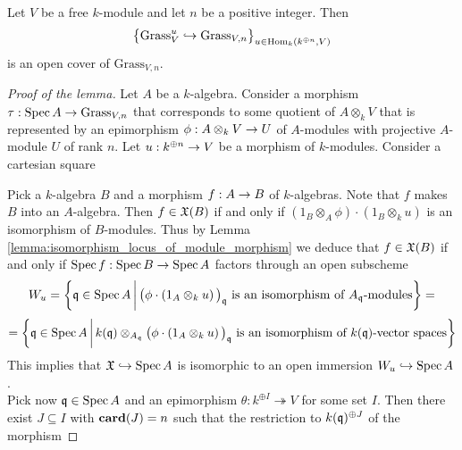 \begin{lemma}\label{lemma:standard_open_cover_of_grassmannian}
Let $V$ be a free $k$-module and let $n$ be a positive integer. Then
$$\big\{\mathrm{Grass}_{V}^u\hookrightarrow \mathrm{Grass}_{V,n} \big\}_{u\in \mathrm{Hom}_k\left(k^{\oplus n},V\right)}$$
is an open cover of $\mathrm{Grass}_{V,n}$.
\end{lemma}
\begin{proof}[Proof of the lemma]
Let $A$ be a $k$-algebra. Consider a morphism $\tau:\mathrm{Spec}\, A\rightarrow \mathrm{Grass}_{V,n}$ that corresponds to some quotient of $A\otimes_kV$ that is represented by an epimorphism $\phi:A\otimes_kV\rightarrow U$ of $A$-modules with projective $A$-module $U$ of rank $n$. Let $u:k^{\oplus n}\rightarrow V$ be a morphism of $k$-modules. Consider a cartesian square
\begin{center}
\end{center}
Pick a $k$-algebra $B$ and a morphism $f:A\rightarrow B$ of $k$-algebras. Note that $f$ makes $B$ into an $A$-algebra. Then $f\in {\mathfrak X}(B)$ if and only if $\left(1_B\otimes_A\phi\right)\cdot \left(1_B\otimes_ku\right)$ is an isomorphism of $B$-modules. Thus by Lemma \ref{lemma:isomorphism_locus_of_module_morphism} we deduce that $f\in {\mathfrak X}(B)$ if and only if $\mathrm{Spec}\, f:\mathrm{Spec}\, B\rightarrow \mathrm{Spec}\, A$ factors through an open subscheme
$$W_u = \bigg\{\mathfrak{q}\in \mathrm{Spec}\, A\,\bigg|\,\big(\phi\cdot \left(1_A\otimes_ku\right)\big)_{\mathfrak{q}}\mbox{ is an isomorphism of }A_{\mathfrak{q}}\mbox{-modules}\bigg\} =$$
$$= \bigg\{\mathfrak{q}\in \mathrm{Spec}\, A\,\bigg|\,k(\mathfrak{q})\otimes_{A_{\mathfrak{q}}}\big(\phi\cdot \left(1_A\otimes_ku\right)\big)_{\mathfrak{q}}\mbox{ is an isomorphism of }k(\mathfrak{q})\mbox{-vector spaces}\bigg\}$$
This implies that ${\mathfrak X} \hookrightarrow \mathrm{Spec}\, A$ is isomorphic to an open immersion $W_u\hookrightarrow \mathrm{Spec}\, A$.\\
Pick now $\mathfrak{q}\in \mathrm{Spec}\, A$ and an epimorphism $\theta:k^{\oplus I}\twoheadrightarrow V$ for some set $I$. Then there exist $J\subseteq I$ with $\mathbf{card}(J) = n$ such that the restriction to $k(\mathfrak{q})^{\oplus J}$ of the morphism

\end{proof}
